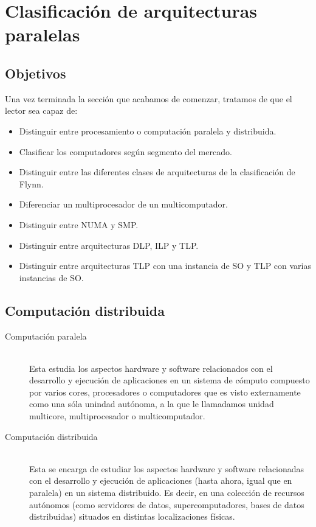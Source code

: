 \newpage
\section{Clasificación de arquitecturas paralelas}
\subsection{Objetivos}
Una vez terminada la sección que acabamos de comenzar, tratamos de que el lector sea capaz de:
\begin{itemize}
    \item Distinguir entre procesamiento o computación paralela y distribuida.
    \item Clasificar los computadores según segmento del mercado.
    \item Distinguir entre las diferentes clases de arquitecturas de la clasificación de Flynn.
    \item Diferenciar un multiprocesador de un multicomputador.
    \item Distinguir entre NUMA y SMP.
    \item Distinguir entre arquitecturas DLP, ILP y TLP.
    \item Distinguir entre arquitecturas TLP con una instancia de SO y TLP con varias instancias de SO.
\end{itemize}

\subsection{Computación distribuida}
\begin{description}
    \item [Computación paralela]~\\
        Esta estudia los aspectos hardware y software relacionados con el desarrollo y ejecución de aplicaciones en un sistema de cómputo compuesto por varios cores, procesadores o computadores que es visto externamente como una sóla unindad autónoma, a la que le llamadamos unidad multicore, multiprocesador o multicomputador.

    \item [Computación distribuida]~\\
        Esta se encarga de estudiar los aspectos hardware y software relacionadas con el desarrollo y ejecución de aplicaciones (hasta ahora, igual que en paralela) en un sistema distribuido. Es decir, en una colección de recursos autónomos (como servidores de datos, supercomputadores, bases de datos distribuidas) situados en distintas localizaciones físicas.
\end{description}

